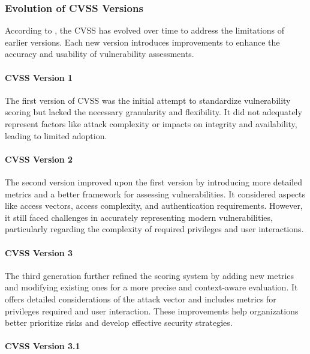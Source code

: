 \subsubsection{Evolution of CVSS Versions}
\label{subsubsec:cvss-versions}

According to \textcite{balbix_inc_cvss_2020}, the \ac{CVSS} has evolved over time to address the limitations of earlier versions. Each new version introduces improvements to enhance the accuracy and usability of vulnerability assessments.

\paragraph{CVSS Version 1}
\label{par:cvss-v1}

The first version of \ac{CVSS} was the initial attempt to standardize vulnerability scoring but lacked the necessary granularity and flexibility. It did not adequately represent factors like attack complexity or impacts on integrity and availability, leading to limited adoption.

\paragraph{CVSS Version 2}
\label{par:cvss-v2}

The second version improved upon the first version by introducing more detailed metrics and a better framework for assessing vulnerabilities. It considered aspects like access vectors, access complexity, and authentication requirements. However, it still faced challenges in accurately representing modern vulnerabilities, particularly regarding the complexity of required privileges and user interactions.

\paragraph{CVSS Version 3}
\label{par:cvss-v3}

The third generation further refined the scoring system by adding new metrics and modifying existing ones for a more precise and context-aware evaluation. It offers detailed considerations of the attack vector and includes metrics for privileges required and user interaction. These improvements help organizations better prioritize risks and develop effective security strategies.

\paragraph{CVSS Version 3.1}
\label{par:cvss-v3_1}

